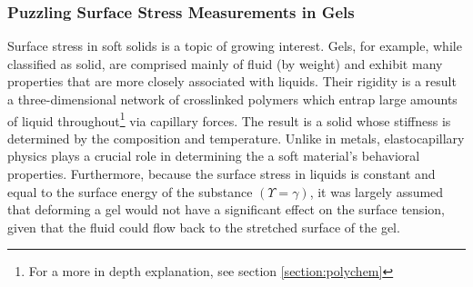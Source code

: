 
\subsubsection{Puzzling Surface Stress Measurements in Gels}
Surface stress in soft solids is a topic of growing interest. Gels, for example, while classified as solid, are comprised mainly of fluid (by weight) and exhibit many properties that are more closely associated with liquids. Their rigidity is a result a three-dimensional network of crosslinked polymers which entrap large amounts of liquid throughout\footnote{For a more in depth explanation, see section \ref{section:polychem}} via capillary forces. The result is a solid whose stiffness is determined by the composition and temperature.  Unlike in metals, elastocapillary physics plays a crucial role in determining the a soft material's behavioral properties. Furthermore, because the surface stress in liquids is constant and equal to the surface energy of the substance $(\Upsilon = \gamma)$, it was largely assumed that deforming a gel would not have a significant effect on the surface tension, given that the fluid could flow back to the stretched surface of the gel. 

